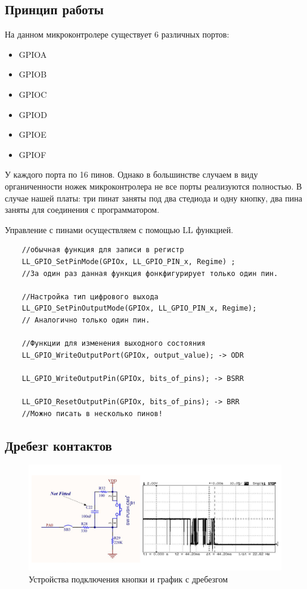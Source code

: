 \subsection{Принцип работы}

На данном микроконтролере существует 6 различных портов:
\begin{itemize}
    \item GPIOA
    \item GPIOB
    \item GPIOC
    \item GPIOD
    \item GPIOE
    \item GPIOF
\end{itemize}   

У каждого порта по 16 пинов. Однако в большинстве случаем в виду органиченности ножек микроконтролера не все порты реализуются полностью. В случае нашей платы: три пинат заняты под два стедиода и одну кнопку, два пина заняты для соединения с программатором. 


Управление с пинами осуществляем с помощью LL функцией.

\begin{verbatim}
    //обычная функция для записи в регистр
    LL_GPIO_SetPinMode(GPIOx, LL_GPIO_PIN_x, Regime) ;
    //За один раз данная функция фонкфигурирует только один пин.

    //Настройка тип цифрового выхода
    LL_GPIO_SetPinOutputMode(GPIOx, LL_GPIO_PIN_x, Regime);
    // Аналогично только один пин.
    
    //Функции для изменения выходного состояния
    LL_GPIO_WriteOutputPort(GPIOx, output_value); -> ODR
    
    LL_GPIO_WriteOutputPin(GPIOx, bits_of_pins); -> BSRR
    
    LL_GPIO_ResetOutputPin(GPIOx, bits_of_pins); -> BRR
    //Можно писать в несколько пинов!

\end{verbatim}


\subsection{Дребезг контактов}


\begin{figure}[h!]
		\centering
		\includegraphics[width=1\linewidth]{pics/drebezg.png}
		\caption{Устройства подключения кнопки и график с дребезгом}
		\label{drebezg}
\end{figure}


